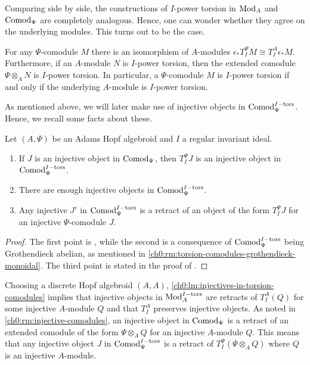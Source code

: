 Comparing side by side, the constructions of $I$-power torsion in $\mathrm{Mod}_A$ and $\mathrm{Comod}_\Psi$ are completely analogous. Hence, one can wonder whether they agree on the underlying modules. This turns out to be the case. 

\begin{lemma}
    \label{ch0:lm:torsion-comodule-iff-torsion-module}
    For any $\Psi$-comodule $M$ there is an isomorphism of $A$-modules $\epsilon_* T^\Psi_I M \cong T^A_I \epsilon_* M.$
    Furthermore, if an $A$-module $N$ is $I$-power torsion, then the extended comodule $\Psi\otimes_A N$ is $I$-power torsion. In particular, a $\Psi$-comodule $M$ is $I$-power torsion if and only if the underlying $A$-module is $I$-power torsion. 
\end{lemma}

As mentioned above, we will later make use of injective objects in $\mathrm{Comod}_\Psi^{I-\mathrm{tors}}$. Hence, we recall some facts about these. 

\begin{lemma}
    \label{ch0:lm:injectives-in-torsion-comodules}
    Let $(A, \Psi)$ be an Adams Hopf algebroid and $I$ a regular invariant ideal.
    \begin{enumerate}
        \item If $J$ is an injective object in $\mathrm{Comod}_\Psi$, then $T_I^\Psi J$ is an injective object in $\mathrm{Comod}_\Psi^{I-\mathrm{tors}}$.
        \item There are enough injective objects in $\mathrm{Comod}_\Psi^{I-\mathrm{tors}}$.
        \item Any injective $J'$ in $\mathrm{Comod}_\Psi^{I-\mathrm{tors}}$ is a retract of an object of the form $T_I^\Psi J$ for an injective $\Psi$-comodule $J$.
    \end{enumerate} 
\end{lemma}
\begin{proof}
    The first point is \cite[2.1.4]{brodmann-sharp_1998}, while the second is a consequence of $\mathrm{Comod}_\Psi^{I-\mathrm{tors}}$ being Grothendieck abelian, as mentioned in \cref{ch0:rm:torsion-comodules-grothendieck-monoidal}. The third point is stated in the proof of \cite[3.16]{barthel-heard-valenzuela_2020}. 
\end{proof}

\begin{remark}
    \label{ch0:rm:injectives-in-torsion-modules}
    Choosing a discrete Hopf algebroid $(A,A)$, \cref{ch0:lm:injectives-in-torsion-comodules} implies that injective objects in $\mathrm{Mod}_A^{I-\mathrm{tors}}$ are retracts of $T_I^A(Q)$ for some injective $A$-module $Q$ and that $T_I^A$ preserves injective objects. As noted in \cref{ch0:rm:injective-comodules}, an injective object in $\mathrm{Comod}_\Psi$ is a retract of an extended comodule of the form $\Psi\otimes_A Q$ for an injective $A$-module $Q$. This means that any injective object $J$ in $\mathrm{Comod}_\Psi^{I-\mathrm{tors}}$ is a retract of $T_I^\Psi(\Psi\otimes_A Q)$ where $Q$ is an injective $A$-module. 
\end{remark}

